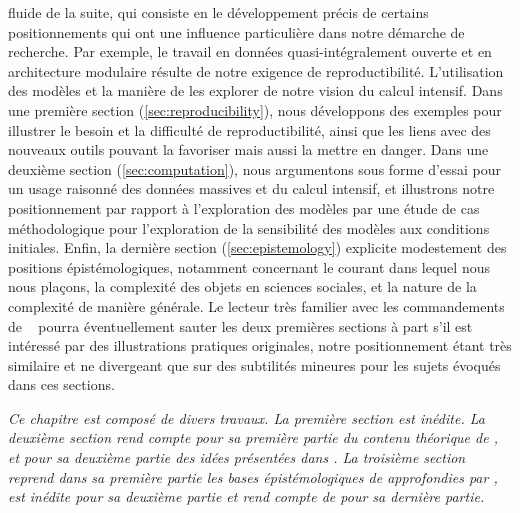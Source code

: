 fluide de la suite, qui consiste en le développement précis de certains positionnements qui ont une influence particulière dans notre démarche de recherche. Par exemple, le travail en données quasi-intégralement ouverte et en architecture modulaire résulte de notre exigence de reproductibilité. L'utilisation des modèles et la manière de les explorer de notre vision du calcul intensif. Dans une première section (\ref{sec:reproducibility}), nous développons des exemples pour illustrer le besoin et la difficulté de reproductibilité, ainsi que les liens avec des nouveaux outils pouvant la favoriser mais aussi la mettre en danger. Dans une deuxième section (\ref{sec:computation}), nous argumentons sous forme d'essai pour un usage raisonné des données massives et du calcul intensif, et illustrons notre positionnement par rapport à l'exploration des modèles par une étude de cas méthodologique pour l'exploration de la sensibilité des modèles aux conditions initiales. Enfin, la dernière section (\ref{sec:epistemology}) explicite modestement des positions épistémologiques, notamment concernant le courant dans lequel nous nous plaçons, la complexité des objets en sciences sociales, et la nature de la complexité de manière générale. Le lecteur très familier avec les commandements de ~\cite{banos2013pour} pourra éventuellement sauter les deux premières sections à part s'il est intéressé par des illustrations pratiques originales, notre positionnement étant très similaire et ne divergeant que sur des subtilités mineures pour les sujets évoqués dans ces sections.




\stars


\textit{Ce chapitre est composé de divers travaux. La première section est inédite. La deuxième section rend compte pour sa première partie du contenu théorique de \cite{raimbault2016cautious}, et pour sa deuxième partie des idées présentées dans \cite{cottineau2017initial}. La troisième section reprend dans sa première partie les bases épistémologiques de \cite{raimbault:halshs-01505084} approfondies par \cite{raimbault2017knowledge}, est inédite pour sa deuxième partie et rend compte de \cite{raimbault2017complex} pour sa dernière partie.
}






